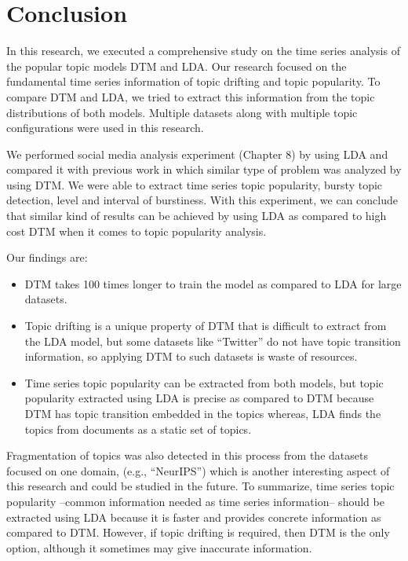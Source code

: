 \documentclass[a4paper]{report}
\begin{document}

\chapter{Conclusion}
In this research, we executed a comprehensive study on the time series analysis of the popular topic models DTM and LDA. Our research focused on the fundamental time series information of topic drifting and topic popularity. To compare DTM and LDA, we tried to extract this information from the topic distributions of both models. Multiple datasets along with multiple topic configurations were used in this research.

We performed social media analysis experiment (Chapter 8) by using LDA and compared it with previous work in which similar type of problem was analyzed by using DTM. We were able to extract time series topic popularity, bursty topic detection, level and interval of burstiness. With this experiment, we can conclude that similar kind of results can be achieved by using LDA as compared to high cost DTM when it comes to topic popularity analysis.

Our findings are:

\begin{itemize}
\item DTM takes 100 times longer to train the model as compared to LDA for large datasets.

\item Topic drifting is a unique property of DTM that is difficult to extract from the LDA model, but some datasets like ``Twitter'' do not have topic transition information, so applying DTM to such datasets is waste of resources.

\item Time series topic popularity can be extracted from both models, but topic popularity extracted using LDA is precise as compared to DTM because DTM has topic transition embedded in the topics whereas, LDA finds the topics from documents as a static set of topics.
\end{itemize}

 Fragmentation of topics was also detected in this process from the datasets focused on one domain, (e.g., ``NeurIPS'') which is another interesting aspect of this research and could be studied in the future. To summarize, time series topic popularity --common information needed as time series information-- should be extracted using LDA because it is faster and provides concrete information as compared to DTM. However, if topic drifting is required, then DTM is the only option, although it sometimes may give inaccurate information.
 
\end{document}
